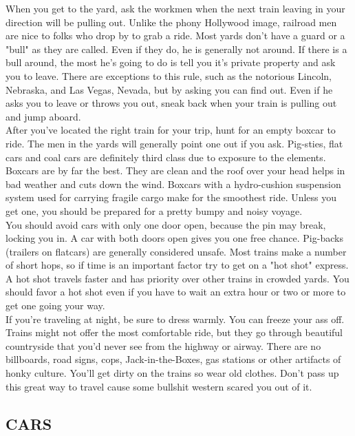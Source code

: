 \documentclass[11pt,twoside,a4paper]{book}
\begin{document}
When you get to the yard, ask the workmen when the next train leaving in your direction will be pulling out. Unlike the phony Hollywood image, railroad men are nice to folks who drop by to grab a ride. Most yards don't have a guard or a "bull" as they are called. Even if they do, he is generally not around. If there is a bull around, the most he's going to do is tell you it's private property and ask you to leave. There are exceptions to this rule, such as the notorious Lincoln, Nebraska, and Las Vegas, Nevada, but by asking you can find out. Even if he asks you to leave or throws you out, sneak back when your train is pulling out and jump aboard.~\\

After you've located the right train for your trip, hunt for an empty boxcar to ride. The men in the yards will generally point one out if you ask. Pig-sties, flat cars and coal cars are definitely third class due to exposure to the elements. Boxcars are by far the best. They are clean and the roof over your head helps in bad weather and cuts down the wind. Boxcars with a hydro-cushion suspension system used for carrying fragile cargo make for the smoothest ride. Unless you get one, you should be prepared for a pretty bumpy and noisy voyage.~\\

You should avoid cars with only one door open, because the pin may break, locking you in. A car with both doors open gives you one free chance. Pig-backs (trailers on flatcars) are generally considered unsafe. Most trains make a number of short hops, so if time is an important factor try to get on a "hot shot" express. A hot shot travels faster and has priority over other trains in crowded yards. You should favor a hot shot even if you have to wait an extra hour or two or more to get one going your way.~\\

If you're traveling at night, be sure to dress warmly. You can freeze your ass off. Trains might not offer the most comfortable ride, but they go through beautiful countryside that you'd never see from the highway or airway. There are no billboards, road signs, cops, Jack-in-the-Boxes, gas stations or other artifacts of honky culture. You'll get dirty on the trains so wear old clothes. Don't pass up this great way to travel cause some bullshit western scared you out of it.

\subsection{CARS}
\end{document}
